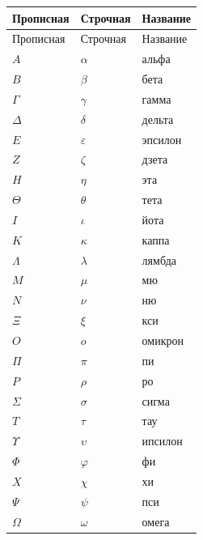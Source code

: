 \begin{longtable}{|p{.23\linewidth}|p{.23\linewidth}|p{.44\linewidth}|}\hline Прописная&Строчная&Название\\\hline\endfirsthead\hline Прописная&Строчная&Название\\\hline\endhead

\(A\)&\(\alpha\)&альфа\\\hline

\(B\)&\(\beta\)&бета\\\hline

\(\Gamma\)&\(\gamma\)&гамма\\\hline

\(\Delta\)&\(\delta\)&дельта\\\hline

\(E\)&\(\varepsilon\)&эпсилон\\\hline

\(Z\)&\(\zeta\)&дзета\\\hline

\(H\)&\(\eta\)&эта\\\hline

\(\Theta\)&\(\theta\)&тета\\\hline

\(I\)&\(\iota\)&йота\\\hline

\(K\)&\(\kappa\)&каппа\\\hline

\(\Lambda\)&\(\lambda\)&лямбда\\\hline

\(M\)&\(\mu\)&мю\\\hline

\(N\)&\(\nu\)&ню\\\hline

\(\Xi\)&\(\xi\)&кси\\\hline

\(O\)&\(o\)&омикрон\\\hline

\(\Pi\)&\(\pi\)&пи\\\hline

\(P\)&\(\rho\)&ро\\\hline

\(\Sigma\)&\(\sigma\)&сигма\\\hline

\(T\)&\(\tau\)&тау\\\hline

\(\Upsilon\)&\(\upsilon\)&ипсилон\\\hline

\(\Phi\)&\(\varphi\)&фи\\\hline

\(X\)&\(\chi\)&хи\\\hline

\(\Psi\)&\(\psi\)&пси\\\hline

\(\Omega\)&\(\omega\)&омега\\\hline

\end{longtable}

\endgroup
